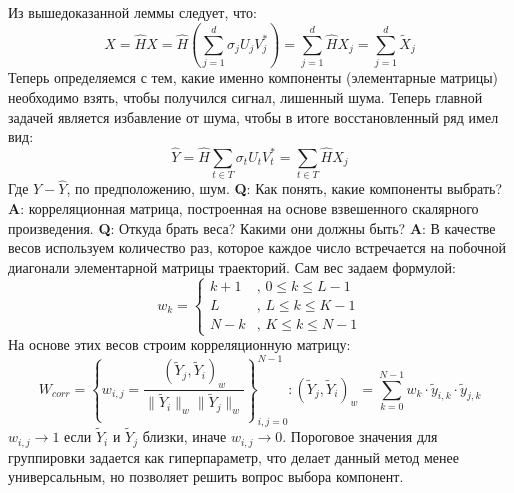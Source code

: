 \noindent Из вышедоказанной леммы следует, что:
\begin{equation}
	X = \hat{H}X = \hat{H} \left(\sum_{j = 1}^{d} \sigma_j U_j V_j^*\right) = \sum_{j = 1}^{d} \hat{H}X_j = \sum_{j = 1}^{d} \tilde{X}_j
\end{equation}
\noindent Теперь определяемся с тем, какие именно компоненты (элементарные матрицы) необходимо взять, чтобы получился сигнал, лишенный шума. Теперь главной задачей является избавление от шума, чтобы в итоге восстановленный ряд имел вид:
\begin{equation}
	\hat{Y} = \hat{H} \sum_{t \in T} \sigma_t U_t V^*_t = \sum_{t \in T} \hat{H}X_j 
\end{equation}
\noindent Где $Y - \hat{Y}$, по предположению, шум. \textbf{Q}: Как понять, какие компоненты выбрать? \textbf{A}: корреляционная матрица, построенная на основе взвешенного скалярного произведения. \textbf{Q}: Откуда брать веса? Какими они должны быть? \textbf{A}: В качестве весов используем количество раз, которое каждое число встречается на побочной диагонали элементарной матрицы траекторий. Сам вес задаем формулой:
\begin{equation}
	w_k = \left\{\begin{array}{ll}
		k + 1 & \text{, } 0 \le k \le L - 1\\
		L & \text{, } L \le k \le K - 1\\
		N - k & \text{, } K \le k \le N - 1
	\end{array}\right.
\end{equation}
На основе этих весов строим корреляционную матрицу:
\begin{equation}
	W_{corr} = \left\{ w_{i, j} = \frac{\left(\tilde{Y}_j, \tilde{Y}_i\right)_w}{\lVert \tilde{Y}_i \rVert_w \lVert \tilde{Y}_j \rVert_w} \right\}_{i, j = 0}^{N - 1}: \left(\tilde{Y}_j, \tilde{Y}_i\right)_w = \sum_{k = 0}^{N - 1} w_k \cdot \tilde{y}_{i, k} \cdot \tilde{y}_{j, k}
\end{equation}
$w_{i, j} \rightarrow 1$ если $\tilde{Y}_i$ и $\tilde{Y}_j$ близки, иначе $w_{i, j} \rightarrow 0$. Пороговое значения для группировки задается как гиперпараметр, что делает данный метод менее универсальным, но позволяет решить вопрос выбора компонент. 

